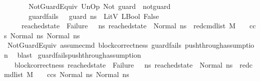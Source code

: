 \begin{isabellebody}
\ \ \ \ \ \ \ NotGuardEquiv{\isacharcolon}{\kern0pt}\ {\isachardoublequoteopen}UnOp\ Not\ guard\ {\isasymsim}\ not{\isacharunderscore}{\kern0pt}guard{\isachardoublequoteclose}\isanewline
\ \ \ \ \ \ \ guard{\isacharunderscore}{\kern0pt}fails{\isacharcolon}{\kern0pt}\ {\isachardoublequoteopen}{\isasymLambda}{\isacharcomma}{\kern0pt}{\isasymGamma}{\isacharcomma}{\kern0pt}{\isasymOmega}\ {\isasymturnstile}\ {\isasymlangle}guard{\isacharcomma}{\kern0pt}\ ns{}{\isasymrangle}\ {\isasymDown}\ LitV\ {\isacharparenleft}{\kern0pt}LBool\ False{\isacharparenright}{\kern0pt}{\isachardoublequoteclose}\isanewline
\ \ \ \ \ {\isachardoublequoteopen}reached{\isacharunderscore}{\kern0pt}state\ {\isasymnoteq}\ Failure\ {\isasymand}\ {\isacharparenleft}{\kern0pt}{\isasymforall}\ ns{}{\isacharprime}{\kern0pt}{\isachardot}{\kern0pt}\ reached{\isacharunderscore}{\kern0pt}state\ {\isacharequal}{\kern0pt}\ Normal\ ns{}{\isacharprime}{\kern0pt}\ {\isasymlongrightarrow}\ {\isacharparenleft}{\kern0pt}red{\isacharunderscore}{\kern0pt}cmd{\isacharunderscore}{\kern0pt}list\ M\ {\isasymLambda}\ {\isasymGamma}\ {\isasymOmega}\ {\isacharparenleft}{\kern0pt}c{\isacharhash}{\kern0pt}cs{}{\isacharparenright}{\kern0pt}\ {\isacharparenleft}{\kern0pt}Normal\ ns{}{\isacharparenright}{\kern0pt}\ {\isacharparenleft}{\kern0pt}Normal\ ns{}{\isacharprime}{\kern0pt}{\isacharparenright}{\kern0pt}{\isacharparenright}{\kern0pt}{\isacharparenright}{\kern0pt}{\isachardoublequoteclose}\ \isanewline
%
\isadelimproof
\ \ \ \ %
\endisadelimproof
%
\isatagproof
{}\isamarkupfalse%
\ NotGuardEquiv\ assume{\isacharunderscore}{\kern0pt}cmd\ block{\isacharunderscore}{\kern0pt}correctness\ guard{\isacharunderscore}{\kern0pt}fails\ push{\isacharunderscore}{\kern0pt}through{\isacharunderscore}{\kern0pt}assumption{}\ \isamarkupfalse%
\ blast%
\endisatagproof
{\isafoldproof}%
%
\isadelimproof
\isanewline
%
\endisadelimproof
\isanewline
{}\isamarkupfalse%
\ guard{\isacharunderscore}{\kern0pt}fails{\isacharunderscore}{\kern0pt}push{\isacharunderscore}{\kern0pt}through{\isacharunderscore}{\kern0pt}assumption{}{\isacharcolon}{\kern0pt}\ \isanewline
\ \ \ block{\isacharunderscore}{\kern0pt}correctness{\isacharcolon}{\kern0pt}\ {\isachardoublequoteopen}reached{\isacharunderscore}{\kern0pt}state\ {\isasymnoteq}\ Failure\ {\isasymand}\ {\isacharparenleft}{\kern0pt}{\isasymforall}\ ns{}{\isacharprime}{\kern0pt}{\isachardot}{\kern0pt}\ reached{\isacharunderscore}{\kern0pt}state\ {\isacharequal}{\kern0pt}\ Normal\ ns{}{\isacharprime}{\kern0pt}\ {\isasymlongrightarrow}\ {\isacharparenleft}{\kern0pt}red{\isacharunderscore}{\kern0pt}cmd{\isacharunderscore}{\kern0pt}list\ M\ {\isasymLambda}\ {\isasymGamma}\ {\isasymOmega}\ {\isacharparenleft}{\kern0pt}c{\isacharhash}{\kern0pt}cs{}{\isacharparenright}{\kern0pt}\ {\isacharparenleft}{\kern0pt}Normal\ ns{}{\isacharparenright}{\kern0pt}\ {\isacharparenleft}{\kern0pt}Normal\ ns{}{\isacharprime}{\kern0pt}{\isacharparenright}{\kern0pt}{\isacharparenright}{\kern0pt}{\isacharparenright}{\kern0pt}{\isachardoublequoteclose}\isanewline

\end{isabellebody}
